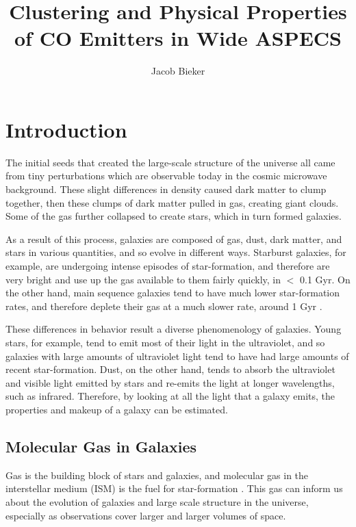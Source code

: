 \documentclass[twoside,single]{lion-msc}
\title{Clustering and Physical Properties of CO Emitters in Wide ASPECS}
\author{Jacob Bieker}
\affiliation{Leiden Observatory, Leiden University}
\begin{document}
\maketitle

\setcounter{page}{2}
\tableofcontents
\cleardoublepage

\setcounter{page}{1}
\chapter{Introduction}

The initial seeds that created the large-scale structure of the universe all came from tiny perturbations which are observable today in the cosmic microwave background. These slight differences in density caused dark matter to clump together, then these clumps of dark matter pulled in gas, creating giant clouds. Some of the gas further collapsed to create stars, which in turn formed galaxies.

As a result of this process, galaxies are composed of gas, dust, dark matter, and stars in various quantities, and so evolve in different ways. Starburst galaxies, for example, are undergoing intense episodes of star-formation, and therefore are very bright and use up the gas available to them fairly quickly, in $<$ 0.1 Gyr. On the other hand, main sequence galaxies tend to have much lower star-formation rates, and therefore deplete their gas at a much slower rate, around 1 Gyr \cite{scoville2017evolution, silverman2015higher}.

These differences in behavior result a diverse phenomenology of galaxies. Young stars, for example, tend to emit most of their light in the ultraviolet, and so galaxies with large amounts of ultraviolet light tend to have had large amounts of recent star-formation. Dust, on the other hand, tends to absorb the ultraviolet and visible light emitted by stars and re-emits the light at longer wavelengths, such as infrared. Therefore, by looking at all the light that a galaxy emits, the properties and makeup of a galaxy can be estimated.

\section{Molecular Gas in Galaxies}

Gas is the building block of stars and galaxies, and molecular gas in the interstellar medium (ISM) is the fuel for star-formation \cite{decarli2019alma}. This gas can inform us about the evolution of galaxies and large scale structure in the universe, especially as observations cover larger and larger volumes of space. 
\end{document}

